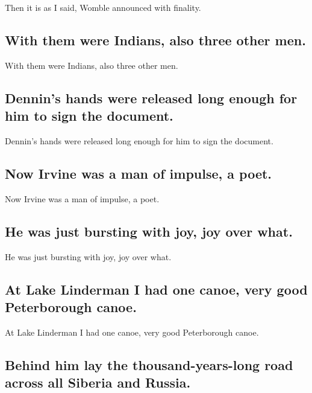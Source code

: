\documentclass[]{article}
\begin{document}
Then it is as I said, Womble announced with finality.

\hypertarget{with-them-were-indians-also-three-other-men.}{%
\subsection{With them were Indians, also three other
men.}\label{with-them-were-indians-also-three-other-men.}}

With them were Indians, also three other men.

\hypertarget{dennins-hands-were-released-long-enough-for-him-to-sign-the-document.}{%
\subsection{Dennin's hands were released long enough for him to sign the
document.}\label{dennins-hands-were-released-long-enough-for-him-to-sign-the-document.}}

Dennin's hands were released long enough for him to sign the document.

\hypertarget{now-irvine-was-a-man-of-impulse-a-poet.}{%
\subsection{Now Irvine was a man of impulse, a
poet.}\label{now-irvine-was-a-man-of-impulse-a-poet.}}

Now Irvine was a man of impulse, a poet.

\hypertarget{he-was-just-bursting-with-joy-joy-over-what.}{%
\subsection{He was just bursting with joy, joy over
what.}\label{he-was-just-bursting-with-joy-joy-over-what.}}

He was just bursting with joy, joy over what.

\hypertarget{at-lake-linderman-i-had-one-canoe-very-good-peterborough-canoe.}{%
\subsection{At Lake Linderman I had one canoe, very good Peterborough
canoe.}\label{at-lake-linderman-i-had-one-canoe-very-good-peterborough-canoe.}}

At Lake Linderman I had one canoe, very good Peterborough canoe.

\hypertarget{behind-him-lay-the-thousand-years-long-road-across-all-siberia-and-russia.}{%
\subsection{Behind him lay the thousand-years-long road across all
Siberia and
Russia.}\label{behind-him-lay-the-thousand-years-long-road-across-all-siberia-and-russia.}}
\end{document}
